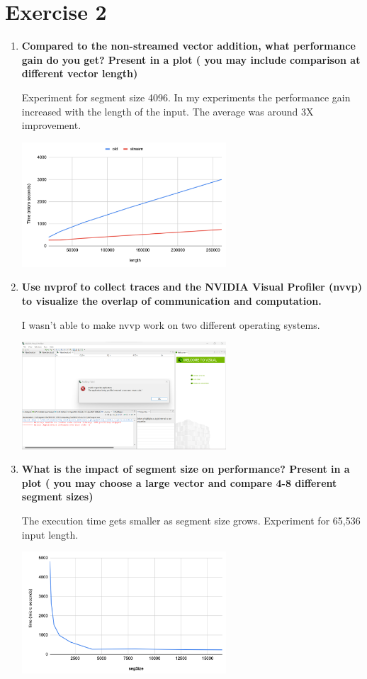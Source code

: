 \documentclass[a4paper,11pt]{scrartcl}
\begin{document}
\section*{Exercise 2}

\begin{enumerate}
  \item \textbf{Compared to the non-streamed vector addition, what performance gain do you get? Present in a plot ( you may include comparison at different vector length)}

  Experiment for segment size 4096. In my experiments the performance gain increased with the length of the input. The average was around 3X improvement.
    
  \includegraphics*[width=0.6\textwidth]{images/length.png}

  \item \textbf{Use nvprof to collect traces and the NVIDIA Visual Profiler (nvvp) to visualize the overlap of communication and computation.}

  I wasn't able to make nvvp work on two different operating systems.

  \includegraphics*[width=0.6\textwidth]{images/err.png}

  \item \textbf{What is the impact of segment size on performance? Present in a plot ( you may choose a large vector and compare 4-8 different segment sizes)}
  
  The execution time gets smaller as segment size grows. Experiment for 65,536 input length.

  \includegraphics*[width=0.6\textwidth]{images/segsize.png}

\end{enumerate}
\end{document}
